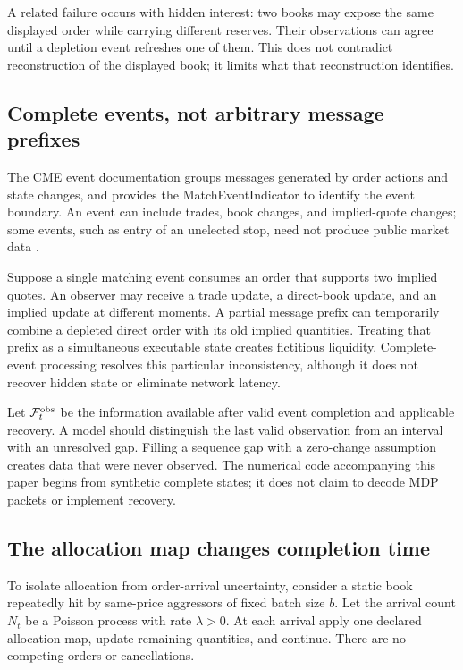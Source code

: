 A related failure occurs with hidden interest: two books may expose the same displayed order while carrying different reserves. Their observations can agree until a depletion event refreshes one of them. This does not contradict reconstruction of the displayed book; it limits what that reconstruction identifies.

\subsection{Complete events, not arbitrary message prefixes}

The CME event documentation groups messages generated by order actions and state changes, and provides the MatchEventIndicator to identify the event boundary. An event can include trades, book changes, and implied-quote changes; some events, such as entry of an unelected stop, need not produce public market data \citep{CMEEvents}.

Suppose a single matching event consumes an order that supports two implied quotes. An observer may receive a trade update, a direct-book update, and an implied update at different moments. A partial message prefix can temporarily combine a depleted direct order with its old implied quantities. Treating that prefix as a simultaneous executable state creates fictitious liquidity. Complete-event processing resolves this particular inconsistency, although it does not recover hidden state or eliminate network latency.

Let $\mathcal F_t^{\rm obs}$ be the information available after valid event completion and applicable recovery. A model should distinguish the last valid observation from an interval with an unresolved gap. Filling a sequence gap with a zero-change assumption creates data that were never observed. The numerical code accompanying this paper begins from synthetic complete states; it does not claim to decode MDP packets or implement recovery.

\subsection{The allocation map changes completion time}

To isolate allocation from order-arrival uncertainty, consider a static book repeatedly hit by same-price aggressors of fixed batch size $b$. Let the arrival count $N_t$ be a Poisson process with rate $\lambda>0$. At each arrival apply one declared allocation map, update remaining quantities, and continue. There are no competing orders or cancellations.

